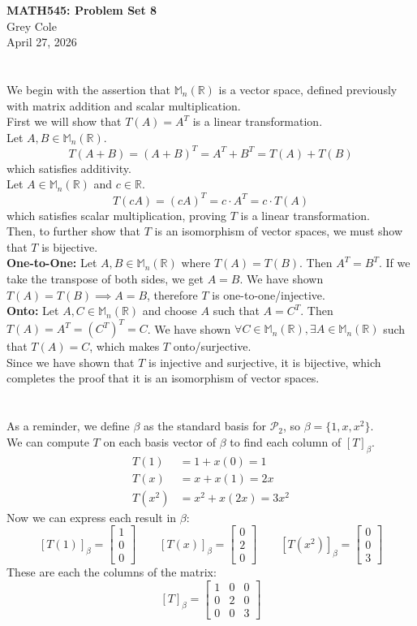 \documentclass[]{article}
\newcommand{\reals}{\mathbb{R}}
\newcommand{\bmat}[1]{\begin{bmatrix}#1\end{bmatrix}}
\begin{document}
	\begin{center}
		{\Large\textbf{MATH545: Problem Set 8}}\\
		\large Grey Cole\\
		April 27, 2026
	\end{center}
	
	\section{}
	We begin with the assertion that $\mathbb{M}_n(\reals)$ is a vector space, defined previously with matrix addition and scalar multiplication.\\
	First we will show that $T(A) = A^T$ is a linear transformation.\\
	Let $A, B \in \mathbb{M}_n(\reals)$.
	\[ T(A + B) = (A + B)^T = A^T + B^T = T(A) + T(B) \]
	which satisfies additivity.\\
	Let $A \in \mathbb{M}_n(\reals)$ and $c \in \reals$.
	\[ T(cA) = (cA)^T = c \cdot A^T = c \cdot T(A) \]
	which satisfies scalar multiplication, proving $T$ is a linear transformation.\\
	Then, to further show that $T$ is an isomorphism of vector spaces, we must show that $T$ is bijective.\\
	\textbf{One-to-One:} Let $A, B \in \mathbb{M}_n(\reals)$ where $T(A) = T(B)$. Then $A^T = B^T$. If we take the transpose of both sides, we get $A = B$. We have shown $T(A) = T(B) \implies A = B$, therefore $T$ is one-to-one/injective.\\
	\textbf{Onto:} Let $A, C \in \mathbb{M}_n(\reals)$ and choose $A$ such that $A = C^T$. Then $T(A) = A^T = (C^T)^T = C$. We have shown $\forall C \in \mathbb{M}_n(\reals), \exists A \in \mathbb{M}_n(\reals)$ such that $T(A) = C$, which makes $T$ onto/surjective.\\
	Since we have shown that $T$ is injective and surjective, it is bijective, which completes the proof that it is an isomorphism of vector spaces.
	
	\section{}
	As a reminder, we define $\beta$ as the standard basis for $\mathcal{P}_2$, so $\beta = \{1, x, x^2\}$.\\
	We can compute $T$ on each basis vector of $\beta$ to find each column of $[T]_{\beta}$.
	\begin{align*}
		T(1) &= 1 + x(0) = 1\\
		T(x) &= x + x(1) = 2x\\
		T(x^2) &= x^2 + x(2x) = 3x^2
	\end{align*}
	Now we can express each result in $\beta$:
	\[
		[T(1)]_{\beta} = \bmat{1\\0\\0} \qquad
		[T(x)]_{\beta} = \bmat{0\\2\\0}\qquad
		[T(x^2)]_{\beta} = \bmat{0\\0\\3}
	\]
	These are each the columns of the matrix:
	\[ \boxed{[T]_{\beta} = \bmat{1&0&0\\0&2&0\\0&0&3}} \]
	
\end{document}
